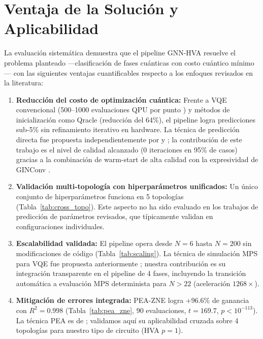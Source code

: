 \documentclass[11pt,a4paper,spanish]{book}
\begin{document}
\section{Ventaja de la Solución y Aplicabilidad}

La evaluación sistemática demuestra que el pipeline GNN-HVA resuelve el problema planteado ---clasificación de fases cuánticas con costo cuántico mínimo--- con las siguientes ventajas cuantificables respecto a los enfoques revisados en la literatura:

\begin{enumerate}
    \item \textbf{Reducción del costo de optimización cuántica:} Frente a VQE convencional (500--1000 evaluaciones QPU por punto \citep{tilly2022}) y métodos de inicialización como Qracle \citep{zhang2025} (reducción del 64\%), el pipeline logra predicciones sub-5\% sin refinamiento iterativo en hardware. La técnica de predicción directa fue propuesta independientemente por \citet{miao2024} y \citet{zhang2025}; la contribución de este trabajo es el nivel de calidad alcanzado (0 iteraciones en 95\% de casos) gracias a la combinación de warm-start de alta calidad \citep{puig2025} con la expresividad de GINConv \citep{xu2019}.

    \item \textbf{Validación multi-topología con hiperparámetros unificados:} Un único conjunto de hiperparámetros funciona en 5 topologías (Tabla~\ref{tab:cross_topo}). Este aspecto no ha sido evaluado en los trabajos de predicción de parámetros revisados, que típicamente validan en configuraciones individuales.

    \item \textbf{Escalabilidad validada:} El pipeline opera desde $N = 6$ hasta $N = 200$ sin modificaciones de código (Tabla~\ref{tab:scaling}). La técnica de simulación MPS para VQE fue propuesta anteriormente \citep{hauschild2018}; nuestra contribución es su integración transparente en el pipeline de 4 fases, incluyendo la transición automática a evaluación MPS determinista para $N > 22$ (aceleración $1268\times$).

    \item \textbf{Mitigación de errores integrada:} PEA-ZNE \citep{kim2023} logra +96.6\% de ganancia con $R^2 = 0.998$ (Tabla~\ref{tab:pea_zne}, 90 evaluaciones, $t = 169.7$, $p < 10^{-113}$). La técnica PEA es de \citet{kim2023}; validamos aquí su aplicabilidad cruzada sobre 4 topologías para nuestro tipo de circuito (HVA $p=1$).
\end{enumerate}
\end{document}
